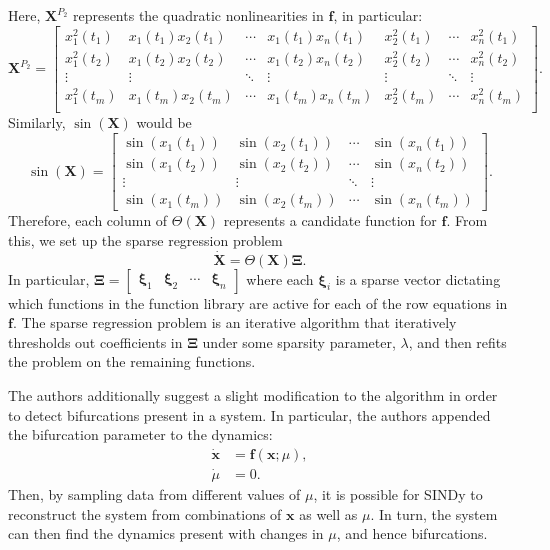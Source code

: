 \documentclass[10pt]{paper}
\begin{document}
Here, $\mathbf X^{P_2}$ represents the quadratic nonlinearities in $\mathbf f$, in particular: 
\[ \mathbf X^{P_2} = \begin{bmatrix}
	x_1^2(t_1) & x_1(t_1)x_2(t_1) & \cdots & x_1(t_1)x_n(t_1) & x_2^2(t_1) & \cdots & x_n^2(t_1) \\
	x_1^2(t_2) & x_1(t_2)x_2(t_2) & \cdots & x_1(t_2)x_n(t_2) & x_2^2(t_2) & \cdots & x_n^2(t_2) \\
	\vdots & \vdots & \ddots & \vdots & \vdots & \ddots & \vdots \\
	x_1^2(t_m) & x_1(t_m)x_2(t_m) & \cdots & x_1(t_m)x_n(t_m) & x_2^2(t_m) & \cdots & x_n^2(t_m) \\
\end{bmatrix}. \]
Similarly, $\sin{(\mathbf X)}$ would be 
\[ \sin{(\mathbf X)} = \begin{bmatrix}
	\sin(x_1(t_1)) & \sin(x_2(t_1)) & \cdots & \sin(x_n(t_1)) \\ 
	\sin(x_1(t_2)) & \sin(x_2(t_2)) & \cdots & \sin(x_n(t_2)) \\
	\vdots & \vdots & \ddots & \vdots \\ 
	\sin(x_1(t_m)) & \sin(x_2(t_m)) & \cdots & \sin(x_n(t_m))
\end{bmatrix}. \]
Therefore, each column of $\Theta(\mathbf X)$ represents a candidate function for $\mathbf f$. From this, we set up the sparse regression problem
\[ \mathbf {\dot X} = \Theta(\mathbf X)\mathbf \Xi. \]
In particular, $\mathbf \Xi = \begin{bmatrix}
	\boldsymbol \xi_1 & \boldsymbol \xi_2 & \cdots & \boldsymbol \xi_n
\end{bmatrix}$ where each $\boldsymbol \xi_i$ is a sparse vector dictating which functions in the function library are active for each of the row equations in $\mathbf f$. The sparse regression problem is an iterative algorithm that iteratively thresholds out coefficients in $\mathbf \Xi$ under some sparsity parameter, $\lambda$, and then refits the problem on the remaining functions. 

The authors additionally suggest a slight modification to the algorithm in order to detect bifurcations present in a system. In particular, the authors appended the bifurcation parameter to the dynamics: 
\begin{equation} \label{eq:sindy_with_bifurcation}
	\begin{split}
		\mathbf {\dot x} &=  \mathbf{f}(\mathbf x; \mu), \\
		\dot \mu &= 0.
	\end{split}
\end{equation}
Then, by sampling data from different values of $\mu$, it is possible for SINDy to reconstruct the system from combinations of $\mathbf x$ as well as $\mu$. In turn, the system can then find the dynamics present with changes in $\mu$, and hence bifurcations. 
\end{document}
